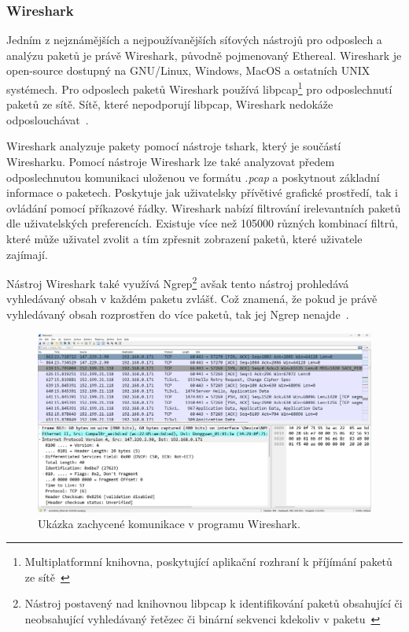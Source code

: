             \subsubsection*{Wireshark}
            Jedním z nejznámějších a nejpoužívanějších síťových nástrojů pro odposlech a analýzu paketů je právě Wireshark, původně pojmenovaný Ethereal. Wireshark je open-source dostupný na GNU/Linux, Windows, MacOS a ostatních UNIX systémech. Pro odposlech paketů Wireshark používá libpcap\footnote{Multiplatformní knihovna, poskytující aplikační rozhraní k příjímání paketů ze sítě~\cite{LibpcapReference}} pro odposlechnutí paketů ze sítě. Sítě, které nepodporují libpcap, Wireshark nedokáže odposlouchávat~\cite{FundamentalsOfNetworkForensicsReference}. 
            
            Wireshark analyzuje pakety pomocí nástroje tshark, který je součástí Wiresharku. Pomocí nástroje Wireshark lze také analyzovat předem odposlechnutou komunikaci uloženou ve formátu \textit{.pcap} a poskytnout základní informace o paketech. Poskytuje jak uživatelsky přívětivé grafické prostředí, tak i ovládání pomocí příkazové řádky. Wireshark nabízí filtrování irelevantních paketů dle uživatelských preferencích. Existuje více než 105000 různých kombinací filtrů, které může uživatel zvolit a tím zpřesnit zobrazení paketů, které uživatele zajímají. 
            
            Nástroj Wireshark také využívá Ngrep\footnote{Nástroj postavený nad knihovnou libpcap k identifikování paketů obsahující či neobsahující vyhledávaný řetězec či binární sekvenci kdekoliv v paketu~\cite{BookTrackingHackersReference}} avšak tento nástroj prohledává vyhledávaný obsah v každém paketu zvlášť. Což znamená, že pokud je právě vyhledávaný obsah rozprostřen do více paketů, tak jej Ngrep nenajde~\cite{BookTrackingHackersReference}.

            \begin{figure}[H]
                \centering
                \includegraphics[scale=0.35]{obrazky-figures/ForenzniAnalyza/tools/Wireshark.png}
                \caption{Ukázka zachycené komunikace v programu Wireshark.}
                \label{fig:my_label}
            \end{figure}          
                
